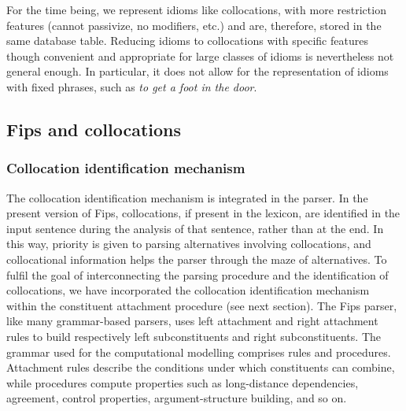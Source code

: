 \documentclass[output=paper]{langsci/langscibook}
\begin{document}
\vspace*{2mm}

\hspace*{3mm}\parbox{11cm}{
  }

\vspace*{2mm}


For the time being, we represent idioms like collocations, with more restriction features (cannot passivize, no modifiers, etc.) and are, therefore, stored in the same database table. Reducing idioms to collocations with specific features though convenient and appropriate for large classes of idioms is nevertheless not general enough. In particular, it does not allow for the representation of idioms with fixed phrases, such as \textit{to get a foot in the door}. 



\subsection{Fips and collocations}
\subsubsection{Collocation identification mechanism}

The collocation identification mechanism is integrated in the parser. In the pre\-sent version of Fips, collocations, if present in the lexicon, are identified in the input sentence during the analysis of that sentence, rather than at the end. In this way, priority is given to parsing alternatives involving collocations, and collocational information helps the parser through the maze of alternatives. 
To fulfil the goal of interconnecting the parsing procedure and the identification of collocations, we have incorporated the collocation identification mechanism within the constituent attachment procedure (see next section). The Fips parser, like many grammar-based parsers, uses left attachment and right attachment rules to build respectively left subconstituents and right subconstituents. The grammar used for the computational modelling comprises rules and procedures. Attachment rules describe the conditions under which constituents can combine, while procedures compute properties such as long-distance dependencies, agreement, control properties, argument-structure building, and so on. 
\end{document}
